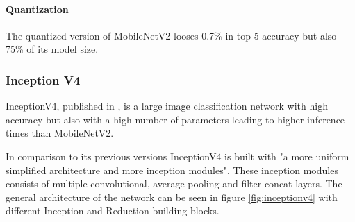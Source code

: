 \paragraph{Quantization}
The quantized version of MobileNetV2 looses 0.7\% in top-5 accuracy but also 75\% of its model size.
\subsubsection{Inception V4}
InceptionV4, published in \cite{InceptionV4}, is a large image classification network with high accuracy but also with a high number of parameters leading to higher inference times than MobileNetV2.

In comparison to its previous versions InceptionV4 is built with "a more uniform simplified architecture and more inception modules". These inception modules consists of multiple convolutional, average pooling and filter concat layers.
The general architecture of the network can be seen in figure \ref{fig:inceptionv4} with different Inception and Reduction building blocks. 
